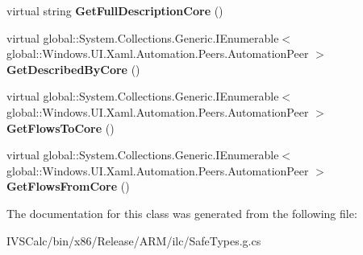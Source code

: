 \begin{DoxyCompactItemize}
virtual string {\bfseries Get\+Full\+Description\+Core} ()
\item 
\mbox{\label{class_windows_1_1_u_i_1_1_xaml_1_1_automation_1_1_peers_1_1_automation_peer_af229ab1160fae56261351af4e4f4e4ab}} 
virtual global\+::\+System.\+Collections.\+Generic.\+I\+Enumerable$<$ global\+::\+Windows.\+U\+I.\+Xaml.\+Automation.\+Peers.\+Automation\+Peer $>$ {\bfseries Get\+Described\+By\+Core} ()
\item 
\mbox{\label{class_windows_1_1_u_i_1_1_xaml_1_1_automation_1_1_peers_1_1_automation_peer_a539ef8ed84355a4ed89c67cfc12b13cb}} 
virtual global\+::\+System.\+Collections.\+Generic.\+I\+Enumerable$<$ global\+::\+Windows.\+U\+I.\+Xaml.\+Automation.\+Peers.\+Automation\+Peer $>$ {\bfseries Get\+Flows\+To\+Core} ()
\item 
\mbox{\label{class_windows_1_1_u_i_1_1_xaml_1_1_automation_1_1_peers_1_1_automation_peer_af28cc07b8f441e466107608f74339c8f}} 
virtual global\+::\+System.\+Collections.\+Generic.\+I\+Enumerable$<$ global\+::\+Windows.\+U\+I.\+Xaml.\+Automation.\+Peers.\+Automation\+Peer $>$ {\bfseries Get\+Flows\+From\+Core} ()
\end{DoxyCompactItemize}


The documentation for this class was generated from the following file\+:\begin{DoxyCompactItemize}
\item 
I\+V\+S\+Calc/bin/x86/\+Release/\+A\+R\+M/ilc/Safe\+Types.\+g.\+cs\end{DoxyCompactItemize}
